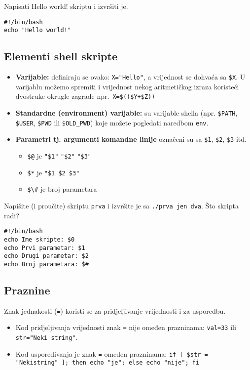 \begin{zadatak}Napisati Hello world! skriptu i izvršiti je.
\begin{lstlisting}
#!/bin/bash 
echo "Hello world!"
\end{lstlisting}
\end{zadatak}
\subsection*{Elementi shell skripte}
\begin{itemize}
 \item \textbf{Varijable: } definiraju se ovako: \lstinline!X="Hello"!, a vrijednost se dohvaća sa \lstinline!$X!. U varijablu možemo spremiti i vrijednost nekog aritmetičkog izraza koristeći dvostruke okrugle zagrade npr.~\lstinline!X=$(($Y+$Z))!
\item \textbf{Standardne (environment) varijable: } su varijable shella (npr. \lstinline!$PATH!, \lstinline!$USER!, \lstinline!$PWD! ili \lstinline!$OLD_PWD!) koje možete pogledati naredbom \texttt{env}.
\item \textbf{Parametri tj. argumenti komandne linije} označeni su sa \lstinline!$1!, \lstinline!$2!, \lstinline!$3! itd.
\begin{itemize}
 \item \lstinline!$@! je \lstinline!"$1"! \lstinline!"$2"! \lstinline!"$3"!
\item \lstinline!$*! je \lstinline!"$1 $2 $3"!
\item \lstinline!$\#! je broj parametara
\end{itemize}

\end{itemize}

\begin{zadatak}
Napišite (i proučite) skriptu \texttt{prva} i izvršite je sa \texttt{./prva jen dva}. Što skripta radi?
\begin{lstlisting}
#!/bin/bash
echo Ime skripte: $0
echo Prvi parametar: $1
echo Drugi parametar: $2
echo Broj parametara: $#
\end{lstlisting}
\end{zadatak}
\subsection*{Praznine}
Znak jednakosti (\lstinline!=!) koristi se za pridjeljivanje vrijednosti i za usporedbu.
\begin{itemize}
\item 
Kod pridjeljivanja vrijednosti znak \lstinline!=! nije omeđen prazninama: \lstinline!val=33! ili \lstinline!str="Neki string"!.
\item Kod uspoređivanja je znak \lstinline!=! omeđen prazninama: \lstinline!if [ $str = "Nekistring" ]; then echo "je"; else echo "nije"; fi!
\end{itemize}

